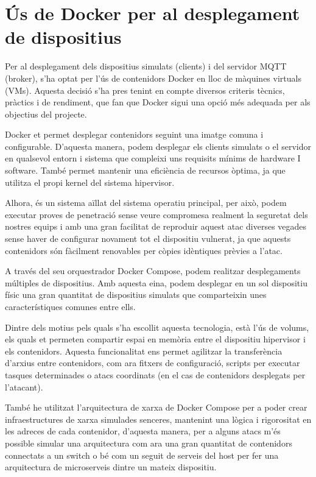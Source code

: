 \section{Ús de Docker per al desplegament de dispositius}

  Per al desplegament dels dispositius simulats (clients) i del servidor MQTT (broker), s’ha optat per l’ús de contenidors Docker en lloc de màquines virtuals (VMs). Aquesta decisió s’ha pres tenint en compte diversos criteris tècnics, pràctics i de rendiment, que fan que Docker sigui una opció més adequada per als objectius del projecte.

  Docker et permet desplegar contenidors seguint una imatge comuna i configurable. D’aquesta manera, podem desplegar els clients simulats o el servidor en qualsevol entorn i sistema que compleixi uns requisits mínims de hardware I software. També permet mantenir una eficiència de recursos òptima, ja que utilitza el propi kernel del sistema hipervisor.

  Alhora, és un sistema aïllat del sistema operatiu principal, per això, podem executar proves de penetració sense veure compromesa realment la seguretat dels nostres equips i amb una gran facilitat de reproduir aquest atac diverses vegades sense haver de configurar novament tot el dispositiu vulnerat, ja que aquests contenidors són fàcilment renovables per còpies idèntiques prèvies a l'atac.
  
  A través del seu orquestrador Docker Compose, podem realitzar desplegaments múltiples de dispositius. Amb aquesta eina, podem desplegar en un sol dispositiu físic una gran quantitat de dispositius simulats que comparteixin unes característiques comunes entre ells.

  Dintre dels motius pels quals s’ha escollit aquesta tecnologia, està l’ús de volums, els quals et permeten compartir espai en memòria entre el dispositiu hipervisor i els contenidors. Aquesta funcionalitat ens permet agilitzar la transferència d’arxius entre contenidors, com ara fitxers de configuració, scripts per executar tasques determinades o atacs coordinats (en el cas de contenidors desplegats per l’atacant).

  També he utilitzat l’arquitectura de xarxa de Docker Compose per a poder crear infraestructures de xarxa simulades senceres, mantenint una lògica i rigorositat en les adreces de cada contenidor, d’aquesta manera, per a alguns atacs m’és possible simular una arquitectura com ara una gran quantitat de contenidors connectats a un switch o bé com un seguit de serveis del host per fer una arquitectura de microserveis dintre un mateix dispositiu.

